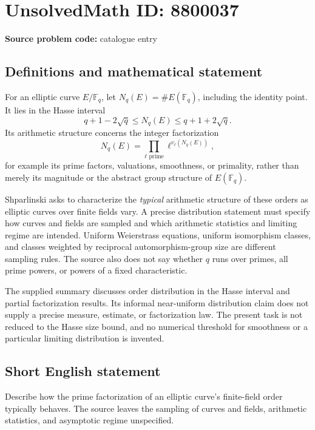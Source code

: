 \documentclass[11pt]{article}
\newcommand{\F}{\mathbb{F}}
\begin{document}
\section*{UnsolvedMath ID: 8800037}
\textbf{Source problem code:} catalogue entry
\subsection{Definitions and mathematical statement}
For an elliptic curve \(E/\F_q\), let \(N_q(E)=\#E(\F_q)\), including the identity point. It lies in the Hasse interval
\[
 q+1-2\sqrt q\leq N_q(E)\leq q+1+2\sqrt q.
\]
Its arithmetic structure concerns the integer factorization
\[
 N_q(E)=\prod_{\ell\text{ prime}}\ell^{v_\ell(N_q(E))},
\]
for example its prime factors, valuations, smoothness, or primality, rather than merely its magnitude or the abstract group structure of \(E(\F_q)\).

Shparlinski asks to characterize the \emph{typical} arithmetic structure of these orders as elliptic curves over finite fields vary. A precise distribution statement must specify how curves and fields are sampled and which arithmetic statistics and limiting regime are intended. Uniform Weierstrass equations, uniform isomorphism classes, and classes weighted by reciprocal automorphism-group size are different sampling rules. The source also does not say whether \(q\) runs over primes, all prime powers, or powers of a fixed characteristic.

The supplied summary discusses order distribution in the Hasse interval and partial factorization results. Its informal near-uniform distribution claim does not supply a precise measure, estimate, or factorization law. The present task is not reduced to the Hasse size bound, and no numerical threshold for smoothness or a particular limiting distribution is invented.
\subsection{Short English statement}
Describe how the prime factorization of an elliptic curve's finite-field order typically behaves. The source leaves the sampling of curves and fields, arithmetic statistics, and asymptotic regime unspecified.
\end{document}
